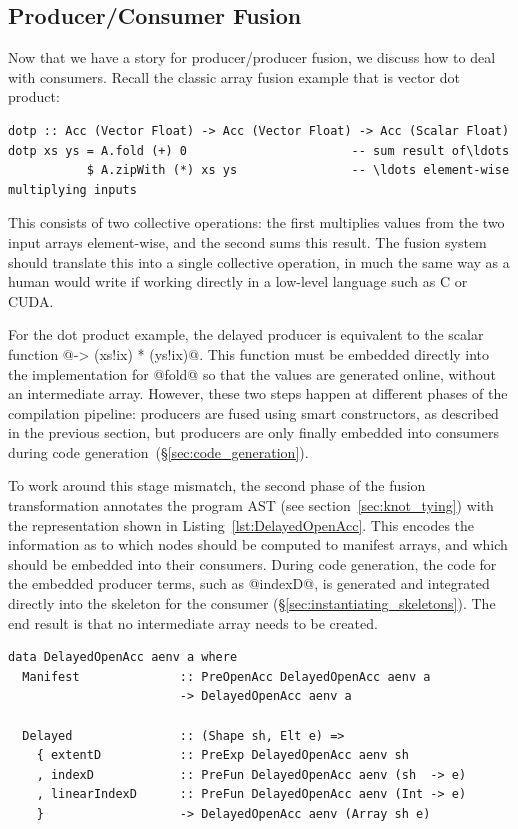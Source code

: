 \subsection{Producer/Consumer Fusion}
\label{sec:producer_consumer_fusion}

Now that we have a story for producer/producer fusion, we discuss how to deal
with consumers. Recall the classic array fusion example that is vector dot
product:

\begin{lstlisting}[style=haskell]
dotp :: Acc (Vector Float) -> Acc (Vector Float) -> Acc (Scalar Float)
dotp xs ys = A.fold (+) 0                       -- sum result of\ldots
           $ A.zipWith (*) xs ys                -- \ldots element-wise multiplying inputs
\end{lstlisting}
%
This consists of two collective operations: the first multiplies values from the
two input arrays element-wise, and the second sums this result. The fusion
system should translate this into a single collective operation, in much the
same way as a human would write if working directly in a low-level language such
as C or CUDA\@.

For the dot product example, the delayed producer is equivalent to the scalar
function @\ix -> (xs!ix) * (ys!ix)@. This function must be embedded directly
into the implementation for @fold@ so that the values are generated online,
without an intermediate array. However, these two steps happen at different
phases of the compilation pipeline: producers are fused using smart
constructors, as described in the previous section, but producers are only
finally embedded into consumers during code
generation~(\S\ref{sec:code_generation}).

To work around this stage mismatch, the second phase of the fusion
transformation annotates the program AST (see section~\ref{sec:knot_tying}) with
the representation shown in Listing~\ref{lst:DelayedOpenAcc}. This encodes the
information as to which nodes should be computed to manifest arrays, and which
should be embedded into their consumers. During code generation, the code for
the embedded producer terms, such as @indexD@, is generated and integrated
directly into the skeleton for the consumer
(\S\ref{sec:instantiating_skeletons}). The end result is that no intermediate
array needs to be created.

\begin{lstlisting}[style=haskell_float
    ,name=DelayedOpenAcc
    ,label=lst:DelayedOpenAcc
    ,caption={The type of delayed arrays in Accelerate}]
data DelayedOpenAcc aenv a where
  Manifest              :: PreOpenAcc DelayedOpenAcc aenv a
                        -> DelayedOpenAcc aenv a

  Delayed               :: (Shape sh, Elt e) =>
    { extentD           :: PreExp DelayedOpenAcc aenv sh
    , indexD            :: PreFun DelayedOpenAcc aenv (sh  -> e)
    , linearIndexD      :: PreFun DelayedOpenAcc aenv (Int -> e)
    }                   -> DelayedOpenAcc aenv (Array sh e)
\end{lstlisting}


